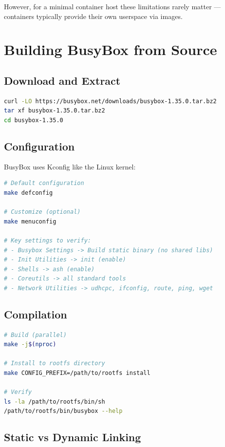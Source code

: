 However, for a minimal container host these limitations rarely matter
--- containers typically provide their own userspace via images.

\section{Building BusyBox from Source}

\subsection{Download and Extract}

\begin{lstlisting}[language=bash]
curl -LO https://busybox.net/downloads/busybox-1.35.0.tar.bz2
tar xf busybox-1.35.0.tar.bz2
cd busybox-1.35.0
\end{lstlisting}

\subsection{Configuration}

BusyBox uses Kconfig like the Linux kernel:

\begin{lstlisting}[language=bash]
# Default configuration
make defconfig

# Customize (optional)
make menuconfig

# Key settings to verify:
# - Busybox Settings -> Build static binary (no shared libs)
# - Init Utilities -> init (enable)
# - Shells -> ash (enable)
# - Coreutils -> all standard tools
# - Network Utilities -> udhcpc, ifconfig, route, ping, wget
\end{lstlisting}

\subsection{Compilation}

\begin{lstlisting}[language=bash]
# Build (parallel)
make -j$(nproc)

# Install to rootfs directory
make CONFIG_PREFIX=/path/to/rootfs install

# Verify
ls -la /path/to/rootfs/bin/sh
/path/to/rootfs/bin/busybox --help
\end{lstlisting}

\subsection{Static vs Dynamic Linking}

